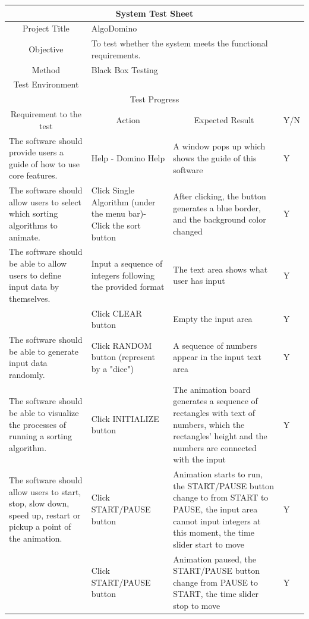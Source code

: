 \documentclass[paper=a4, fontsize=11pt,twoside]{scrartcl}		%
\begin{document}
\begin{table}[H]
\begin{tabular}{|p{4cm}|p{4cm}|p{5cm}|p{0.5cm}|}
\hline
\multicolumn{4}{|c|}{System Test Sheet} \\ \hline
\multicolumn{1}{|c|}{Project Title} & \multicolumn{3}{l|}{AlgoDomino} \\ \hline
\multicolumn{1}{|c|}{Objective} & \multicolumn{3}{l|}{To test whether the system meets the functional requirements.} \\ \hline
\multicolumn{1}{|c|}{Method} & \multicolumn{3}{l|}{Black Box Testing} \\ \hline
\multicolumn{1}{|c|}{Test Environment} & \multicolumn{3}{l|}{} \\ \hline
\multicolumn{4}{|c|}{Test Progress} \\ \hline
\multicolumn{1}{|c|}{Requirement to the test} & \multicolumn{1}{c|}{Action} & \multicolumn{1}{c|}{Expected Result} & \multicolumn{1}{c|}{Y/N} \\ \hline
The software should provide users a guide of how to use core features. & Help - Domino Help & A window pops up which shows the guide of this software & Y \\ \hline
The software should allow users to select which sorting algorithms to animate. & Click Single Algorithm (under the menu bar)- Click the sort button & After clicking, the button generates a blue border, and the background color changed & Y \\ \hline
The software should be able to allow users to define input data by themselves. & Input a sequence of integers following the provided format & The text area shows what user has input & Y \\ \hline
 & Click CLEAR button & Empty the input area & Y \\ \hline
The software should be able to generate input data randomly. & Click RANDOM button (represent by a "dice") & A sequence of numbers appear in the input text area & Y \\ \hline
The software should be able to visualize the processes of running a sorting algorithm. & Click INITIALIZE button & The animation board generates a sequence of rectangles with text of numbers, which the rectangles' height and the numbers are connected with the input & Y \\ \hline
The software should allow users to start, stop, slow down, speed up, restart or pickup a point of the animation. & Click START/PAUSE button & Animation starts to run, the START/PAUSE button change to from START to PAUSE, the input area cannot input integers at this moment, the time slider start to move & Y \\ \hline
& Click START/PAUSE button & Animation paused, the START/PAUSE button change from PAUSE to START, the time slider stop to move & Y \\ \hline
\end{tabular}
\end{table}
\end{document}
